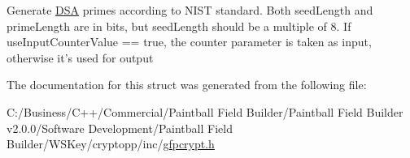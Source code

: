 Generate \hyperlink{struct_d_s_a}{DSA} primes according to NIST standard. Both seedLength and primeLength are in bits, but seedLength should be a multiple of 8. If useInputCounterValue == true, the counter parameter is taken as input, otherwise it's used for output 

The documentation for this struct was generated from the following file:\begin{DoxyCompactItemize}
\item 
C:/Business/C++/Commercial/Paintball Field Builder/Paintball Field Builder v2.0.0/Software Development/Paintball Field Builder/WSKey/cryptopp/inc/\hyperlink{gfpcrypt_8h}{gfpcrypt.h}\end{DoxyCompactItemize}

